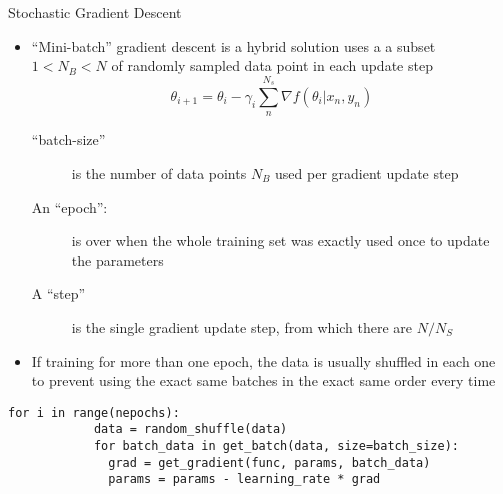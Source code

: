   \begin{frame}[fragile]{Stochastic Gradient Descent}
    \begin{itemize}
      \item \enquote{Mini-batch} gradient descent is a hybrid solution uses a a subset $1 < N_B < N$ of randomly sampled data point in each update step
      \begin{equation*}
        \theta_{i+1}
        = \theta_i - \gamma_i \sum_n^{N_s} \nabla f(\theta_i | x_n, y_n)
      \end{equation*}
      \begin{description}
        \item[\enquote{batch-size}] is the number of data points $N_B$ used per gradient update step
        \item[An \enquote{epoch}:] is over when the whole training set was exactly used once to update the parameters
        \item[A \enquote{step}] is the single gradient update step, from which there are $N / N_S$
      \end{description}
      \item If training for more than one epoch, the data is usually shuffled in each one to prevent using the exact same batches in the exact same order every time
    \end{itemize}
    \begin{mdframed}
      \begin{lstlisting}[style=dark, gobble=6, title=\lsttitlelight{Example Implementation}]
        for i in range(nepochs):
            data = random_shuffle(data)
            for batch_data in get_batch(data, size=batch_size):
              grad = get_gradient(func, params, batch_data)
              params = params - learning_rate * grad
      \end{lstlisting}
    \end{mdframed}
  \end{frame}


